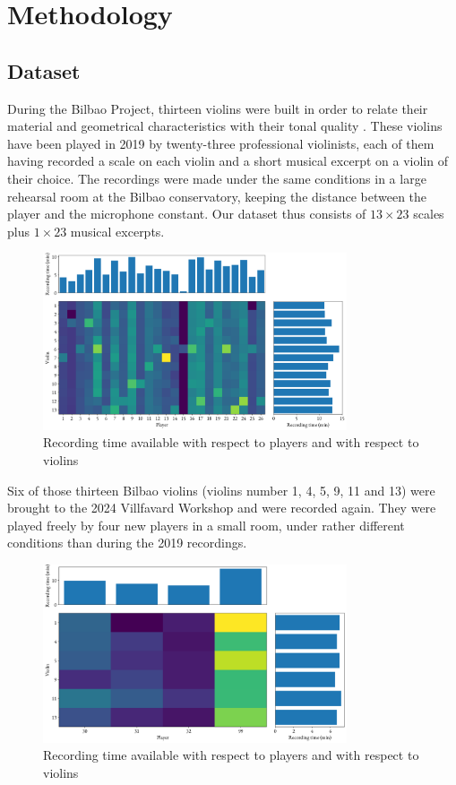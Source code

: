 \documentclass[letterpaper,11pt,leqno]{article}
\begin{document}
\section{Methodology}\label{s:methodology}

\subsection{Dataset}

During the Bilbao Project, thirteen violins were built in order to relate their material and geometrical characteristics with their tonal quality \citep{fritzBilbaoProjectSearching2021}. These violins have been played in 2019 by twenty-three professional violinists, each of them having recorded a scale on each violin and a short musical excerpt on a violin of their choice. The recordings were made under the same conditions in a large rehearsal room at the Bilbao conservatory, keeping the distance between the player and the microphone constant. Our dataset thus consists of $13 \times 23$ scales plus $1 \times 23$ musical excerpts.

\begin{figure}[h]
	\includegraphics[width=0.8\textwidth]{../figures/class_weights.png}
	\caption{Recording time available with respect to players and with respect to violins}
\end{figure}

Six of those thirteen Bilbao violins (violins number 1, 4, 5, 9, 11 and 13) were brought to the 2024 Villfavard Workshop and were recorded again. They were played freely by four new players in a small room, under rather different conditions than during the 2019 recordings.

\begin{figure}[h]
	\includegraphics[width=0.8\textwidth]{../figures/class_weights_2024.png}
	\caption{Recording time available with respect to players and with respect to violins}
\end{figure}
\end{document}
